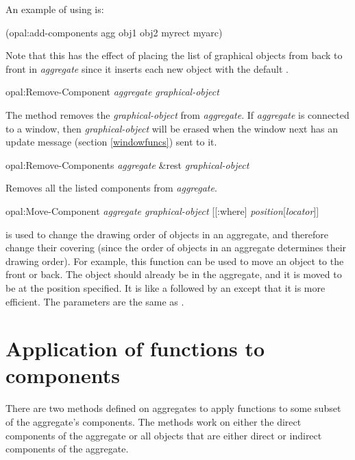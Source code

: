 An example of using  is:
\begin{programexample}
(opal:add-components agg obj1 obj2 myrect myarc)
\end{programexample}

Note that this has the effect of placing the list of graphical objects from
back to front in {\it aggregate} since it inserts each new object with the
default .

\begin{programexample}
opal:Remove-Component {\it aggregate graphical-object}\value{method}
\end{programexample}

The  method removes the
{\it graphical-object} from {\it aggregate}.  If {\it aggregate} is connected to
a window, then {\it graphical-object} will be erased when the window next has
an update message (section \ref{windowfuncs}) sent to it.

\begin{programexample}
opal:Remove-Components {\it aggregate} \&rest {\it graphical-object}\value{function}
\end{programexample}

Removes all the listed components from {\it aggregate}.

\begin{programexample}
opal:Move-Component {\it aggregate graphical-object} [[:where] {\it position}[{\it locator}]]\value{method}
\end{programexample}

 is used to change the drawing order of objects in an
aggregate, and therefore change their covering (since the order of objects
in an aggregate determines their drawing order).  For example, this function
can be used to move an object to the front or back.  The object should
already be in the aggregate, and it is moved to be at the position specified.
It is like a  followed by an  except
that it is more efficient.  The parameters are the same as .


\section{Application of functions to components}

There are two methods defined on aggregates to apply functions to some
subset of the aggregate's components.  The methods work on either the
direct components of the aggregate or all objects that are either direct or
indirect components of the aggregate.

